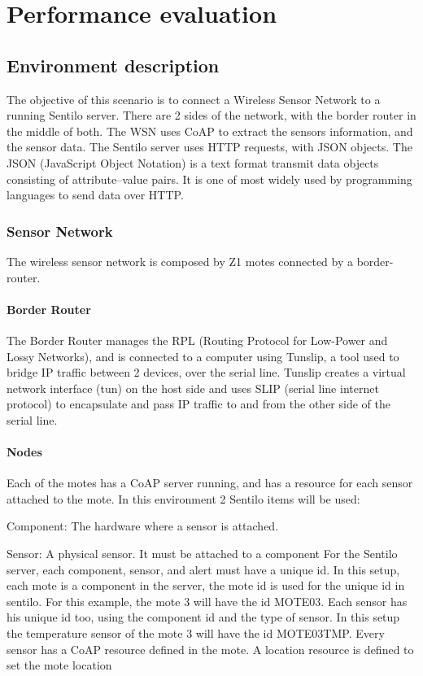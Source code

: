 \section{Performance evaluation}

\subsection{Environment description}

The objective of this scenario is to connect a Wireless Sensor Network to a running Sentilo server.
There are 2 sides of the network,
	with the border router in the middle of both.
The WSN uses CoAP to extract the sensors information,
	and the sensor data.
The Sentilo server uses HTTP requests,
	with JSON objects.
The JSON (JavaScript Object Notation) is a text format transmit data objects consisting of attribute–value pairs.
It is one of most widely used by programming languages to send data over HTTP.

\subsubsection{Sensor Network}
The wireless sensor network is composed by Z1 motes connected by a border-router.


\paragraph{Border Router}
The Border Router manages the RPL (Routing Protocol for Low-Power and Lossy Networks),
	and is connected to a computer using Tunslip,
	a tool used to bridge IP traffic between 2 devices,
	over the serial line.
Tunslip creates a virtual network interface (tun) on the host side and uses SLIP (serial line internet protocol) to encapsulate and pass IP traffic to and from the other side of the serial line.

\paragraph{Nodes}
Each of the motes has a CoAP server running,
	and has a resource for each sensor attached to the mote.
In this environment 2 Sentilo items will be used:

Component:
	The hardware where a sensor is attached.

Sensor:
	A physical sensor.
It must be attached to a component For the Sentilo server,
	each component,
	sensor,
	and alert must have a unique id.
In this setup,
	each mote is a component in the server,
	the mote id is used for the unique id in sentilo.
For this example,
	the mote 3 will have the id MOTE03.
Each sensor has his unique id too,
	using the component id and the type of sensor.
In this setup the temperature sensor of the mote 3 will have the id MOTE03TMP.
Every sensor has a CoAP resource defined in the mote.
A location resource is defined to set the mote location 

